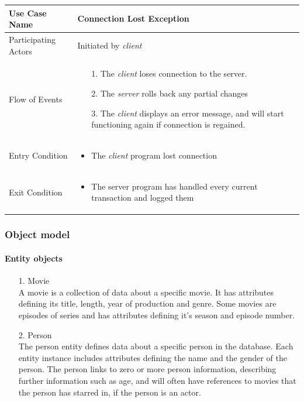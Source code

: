 \begin{center}
	\begin{tabular}{ | l | p{10cm} |  }
		 \hline
		Use Case Name & Connection Lost Exception \\ \hline
		Participating Actors & Initiated by \emph{client} \\ \hline
		Flow of Events & \begin{enumerate}
						\item[1.] The \emph{client} loses connection to the server.
						\item[2.] The \emph{server} rolls back any partial changes
						\item[3.] The \emph{client} displays an error message, and will start functioning again if connection is regained.  
						\end{enumerate} \\ \hline
		Entry Condition & \begin{itemize}
						\item The \emph{client} program lost connection
					\end{itemize} \\ \hline
		Exit Condition & \begin{itemize}
						\item The server program has handled every current transaction and logged them
					\end{itemize} \\
		\hline
	\end{tabular}
\end{center}

\subsubsection{Object model}

\paragraph{Entity objects}

\begin{enumerate}
	\item[1.] Movie \hfill \\
	A movie is a collection of data about a specific movie. It has attributes defining its title, length, year of production and genre. Some movies are episodes of series and has attributes defining it's season and episode number.
	
	\item[2.] Person \hfill \\
	The person entity defines data about a specific person in the database. Each entity instance includes attributes defining the name and the gender of the person. The person links to zero or more person information, describing further information such as age, and will often have references to movies that the person has starred in, if the person is an actor.
	
\end{enumerate}

